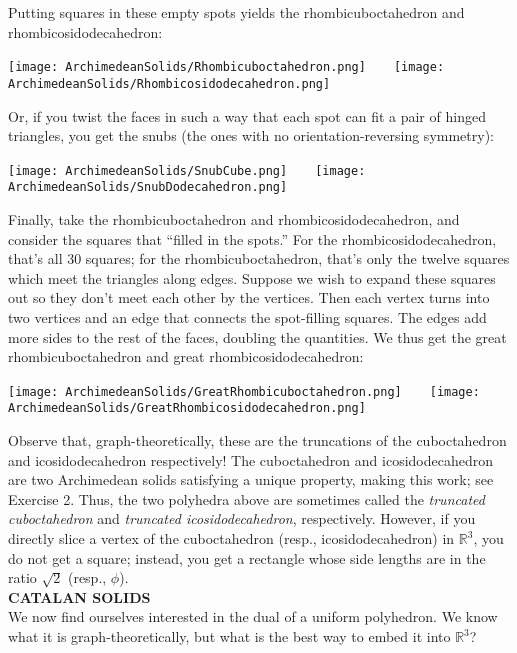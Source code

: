 \documentclass[leqno]{book}
\begin{document}
Putting squares in these empty spots yields the rhombicuboctahedron and rhombicosidodecahedron:
\begin{center}
\texttt{[image: ArchimedeanSolids/Rhombicuboctahedron.png]}~~~~\texttt{[image: ArchimedeanSolids/Rhombicosidodecahedron.png]}
\end{center}
Or, if you twist the faces in such a way that each spot can fit a pair of hinged triangles, you get the snubs (the ones with no orientation-reversing symmetry):
\begin{center}
\texttt{[image: ArchimedeanSolids/SnubCube.png]}~~~~\texttt{[image: ArchimedeanSolids/SnubDodecahedron.png]}
\end{center}
Finally, take the rhombicuboctahedron and rhombicosidodecahedron, and consider the squares that ``filled in the spots.''  For the rhombicosidodecahedron, that's all 30 squares; for the rhombicuboctahedron, that's only the twelve squares which meet the triangles along edges.  Suppose we wish to expand these squares out so they don't meet each other by the vertices.  Then each vertex turns into two vertices and an edge that connects the spot-filling squares.  The edges add more sides to the rest of the faces, doubling the quantities.  We thus get the great rhombicuboctahedron and great rhombicosidodecahedron:
\begin{center}
\texttt{[image: ArchimedeanSolids/GreatRhombicuboctahedron.png]}~~~~\texttt{[image: ArchimedeanSolids/GreatRhombicosidodecahedron.png]}
\end{center}
Observe that, graph-theoretically, these are the truncations of the cuboctahedron and icosidodecahedron respectively!  The cuboctahedron and icosidodecahedron are two Archimedean solids satisfying a unique property, making this work; see Exercise 2.  Thus, the two polyhedra above are sometimes called the \emph{truncated cuboctahedron} and \emph{truncated icosidodecahedron}, respectively.  However, if you directly slice a vertex of the cuboctahedron (resp., icosidodecahedron) in $\mathbb R^3$, you do not get a square; instead, you get a rectangle whose side lengths are in the ratio $\sqrt 2$ (resp., $\phi$).\\

\noindent\textbf{CATALAN SOLIDS}\\

\noindent We now find ourselves interested in the dual of a uniform polyhedron.  We know what it is graph-theoretically, but what is the best way to embed it into $\mathbb R^3$?
\end{document}
